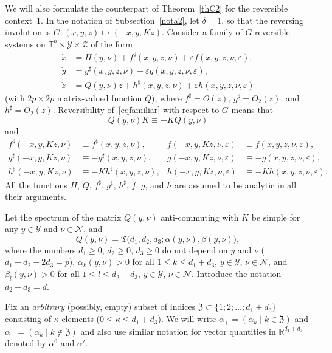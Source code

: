 \documentclass[12pt,reqno]{amsart}
\theoremstyle{definition}
\begin{document}
We will also formulate the counterpart of Theorem~\ref{thC2} for the
reversible context~1. In the notation of Subsection~\ref{nota2}, let
$\delta=1$, so that the reversing involution is $G:(x,y,z)\mapsto(-x,y,Kz)$.
Consider a family of $G$-reversible systems on ${\mathbb T}^n\times{\mathcal Y}\times{\mathcal Z}$ of
the form
\begin{equation}
\begin{aligned}
\dot{x} &= H(y,\nu)+f^\sharp(x,y,z,\nu)+{\varepsilon} f(x,y,z,\nu,{\varepsilon}), \\
\dot{y} &= g^\sharp(x,y,z,\nu)+{\varepsilon} g(x,y,z,\nu,{\varepsilon}), \\
\dot{z} &= Q(y,\nu)z+h^\sharp(x,y,z,\nu)+{\varepsilon} h(x,y,z,\nu,{\varepsilon})
\end{aligned}
\label{eqfamiliar}
\end{equation}
(with $2p\times 2p$ matrix-valued function $Q$), where $f^\sharp=O(z)$,
$g^\sharp=O_2(z)$, and $h^\sharp=O_2(z)$. Reversibility of~\eqref{eqfamiliar}
with respect to $G$ means that
\[
Q(y,\nu)K\equiv-KQ(y,\nu)
\]
and
\begin{align*}
f^\sharp(-x,y,Kz,\nu) &\equiv f^\sharp(x,y,z,\nu), &
f(-x,y,Kz,\nu,{\varepsilon}) &\equiv f(x,y,z,\nu,{\varepsilon}), \\
g^\sharp(-x,y,Kz,\nu) &\equiv -g^\sharp(x,y,z,\nu), &
g(-x,y,Kz,\nu,{\varepsilon}) &\equiv -g(x,y,z,\nu,{\varepsilon}), \\
h^\sharp(-x,y,Kz,\nu) &\equiv -Kh^\sharp(x,y,z,\nu), &
h(-x,y,Kz,\nu,{\varepsilon}) &\equiv -Kh(x,y,z,\nu,{\varepsilon}).
\end{align*}
All the functions $H$, $Q$, $f^\sharp$, $g^\sharp$, $h^\sharp$, $f$, $g$, and
$h$ are assumed to be analytic in all their arguments.

Let the spectrum of the matrix $Q(y,\nu)$ anti-commuting with $K$ be simple
for any $y\in{\mathcal Y}$ and $\nu\in{\mathcal N}$, and
\[
Q(y,\nu)={\mathfrak T}\bigl(d_1,d_2,d_3;\alpha(y,\nu),\beta(y,\nu)\bigr),
\]
where the numbers $d_1{\geqslant} 0$, $d_2{\geqslant} 0$, $d_3{\geqslant} 0$ do not depend on $y$
and $\nu$ ($d_1+d_2+2d_3=p$), $\alpha_k(y,\nu)>0$ for all
$1{\leqslant} k{\leqslant} d_1+d_3$, $y\in{\mathcal Y}$, $\nu\in{\mathcal N}$, and $\beta_l(y,\nu)>0$ for all
$1{\leqslant} l{\leqslant} d_2+d_3$, $y\in{\mathcal Y}$, $\nu\in{\mathcal N}$. Introduce the notation
$d_2+d_3=d$.

Fix an \emph{arbitrary} (possibly, empty) subset of indices
${\mathfrak Z}\subset\{1;2;\ldots;d_1+d_3\}$ consisting of $\kappa$ elements
($0{\leqslant}\kappa{\leqslant} d_1+d_3$). We will write $\alpha_+=(\alpha_k \mid k\in{\mathfrak Z})$
and $\alpha_-=(\alpha_k \mid k\notin{\mathfrak Z})$ and also use similar notation for
vector quantities in ${\mathbb R}^{d_1+d_3}$ denoted by $\alpha^0$ and $\alpha'$.
\end{document}
